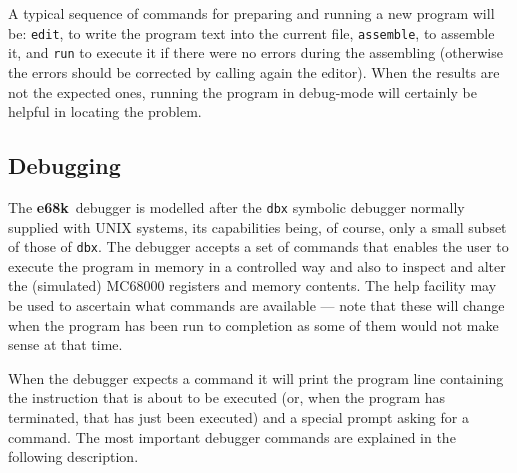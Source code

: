 \documentclass[a4,11pt]{article}
\newcommand{\esek}{{\bf e68k}}
\newcommand{\comm}[1]{{\tt #1}}
\begin{document}
A typical sequence of commands for preparing and running a new program
will be: \comm{edit}, to write the program text into the current file,
\comm{assemble}, to assemble it, and \comm{run} to execute it if there
were no errors during the assembling (otherwise the errors should
be corrected by calling again the editor). When the results are not the
expected ones, running the program in debug-mode will
certainly be helpful in locating the problem.

\subsection{Debugging}

The \esek\    debugger is modelled after the \comm{dbx} symbolic debugger
normally supplied with UNIX systems, its capabilities being, of
course, only a small subset of those of \comm{dbx}. The debugger
accepts a set of commands that enables the user to execute the
program in memory in a controlled way and also to inspect and
alter the (simulated) MC68000 registers and memory contents.
The help facility may be used to ascertain what commands are
available --- note that these will change when the program has
been run to completion as some of them would not make sense at
that time.

When the debugger expects a command
it will print the program line containing the instruction
that is about to be executed (or, when the program has terminated,
that has just been executed) and a
special prompt asking for a command. The most important
debugger commands are explained in the following description.
\end{document}
